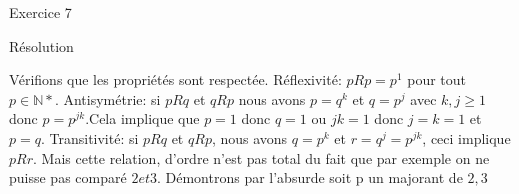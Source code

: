 \hypertarget{Exercice_7}{
\Huge{\begin{center}Exercice 7\end{center} \leavevmode\newline }}

\hypertarget{resolution}{%
\LARGE{Résolution}\label{resolution}}
\newline
\newline
Vérifions que les propriétés sont respectée.
\newline
\newline
Réflexivité: $pRp = p^1$ pour tout $p \in \mathbb{N}*$.
\newline
Antisymétrie: si $pRq$ et $qRp$ nous avons $p=q^k$ et $q=p^j$ avec $k,j \geq 1$ donc $p=p^{jk}$.Cela implique que $p=1$ donc $q=1$ ou $jk=1$ donc $j=k=1$ et $p=q$.
\newline
\newline
Transitivité: si $pRq$ et $qRp$, nous avons $q=p^k$ et $r=q^j=p^{jk}$, ceci implique $pRr$.
\newline
\newline
Mais cette relation, d'ordre n'est pas total du fait que par exemple on ne puisse pas comparé $2 et 3$.
\newline
\newline
Démontrons par l'absurde soit p un majorant de ${2,3}$
\newline
\newline
